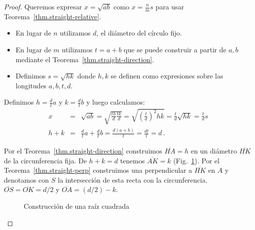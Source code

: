 \begin{proof}
Queremos expresar $x=\sqrt{ab}$ como $x=\displaystyle\frac{n}{m}s$ para usar Teorema~\ref{thm.straight-relative}.
\begin{itemize}
\setlength{\itemsep}{0pt}
\item En lugar de $n$ utilizamos $d$, el diámetro del círculo fijo.
\item En lugar de $m$ utilizamos $t=a+b$ que se puede construir a partir de $a,b$ mediante el Teorema~\ref{thm.straight-direction}.
\item Definimos $s=\sqrt{hk}$ donde $h,k$ se definen como expresiones sobre las longitudes $a,b,t,d$.
\end{itemize}
Definimos $h=\displaystyle\frac{d}{t}a$ y $k=\displaystyle\frac{d}{t}b$ y luego calculamos:
\begin{eqnarray*}
x&=&\sqrt{ab}=\sqrt{\frac{th}{d}\frac{tk}{d}}=\sqrt{\left(\frac{t}{d}\right)^2hk}=\frac{t}{d}\sqrt{hk}=\frac{t}{d}s\\
h+k &=& \frac{d}{t}a + \frac{d}{t}b = \frac{d(a+b)}{t} = \frac{dt}{t} = d\,.
\end{eqnarray*}

Por el Teorema~\ref{thm.straight-direction} construimos $\overline{HA}= h$ en un diámetro $\overline{HK}$ de la circunferencia fija. De $h+k=d$ tenemos $\overline{AK}=k$ (Fig.~\ref{f.se-sqrt}). Por el Teorema~\ref{thm.straight-perp} construimos una perpendicular a $\overline{HK}$ en $A$ y denotamos con $S$ la intersección de esta recta con la circunferencia. $\overline{OS}=\overline{OK}=d/2$ y $\overline{OA}=(d/2)-k$. 
\begin{figure}%
\begin{center}
\end{center}
\caption{Construcción de una raíz cuadrada}\label{f.se-sqrt}
\end{figure}


\end{proof}
